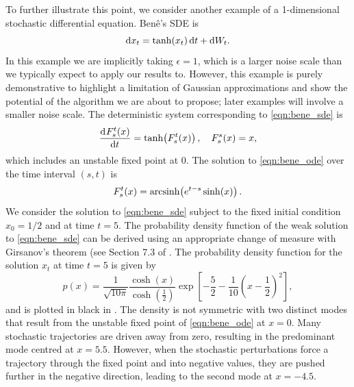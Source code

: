 To further illustrate this point, we consider another example of a 1-dimensional stochastic differential equation.
Ben\^e's SDE \citep{SarkkaSolin_2019_AppliedStochasticDifferential} is
\begin{equation}
	\dif x_t = \tanh\!\left(x_t\right)\dif t + \dif W_t.
	\label{eqn:bene_sde}
\end{equation}
In this example we are implicitly taking \(\epsilon = 1\), which is a larger noise scale than we typically expect to apply our results to.
However, this example is purely demonstrative to highlight a limitation of Gaussian approximations and show the potential of the algorithm we are about to propose; later examples will involve a smaller noise scale.
The deterministic system corresponding to \cref{eqn:bene_sde} is
\begin{equation}
	\dod{F_s^t\!\left(x\right)}{t} = \tanh\!\left(F_s^t\!\left(x\right)\right), \quad F_s^s\!\left(x\right) = x,
	\label{eqn:bene_ode}
\end{equation}
which includes an unstable fixed point at \(0\).
The solution to \cref{eqn:bene_ode} over the time interval \((s,t)\) is
\begin{equation}
	F_s^t\!\left(x\right) = \operatorname{arcsinh}\!\left(e^{t-s}\sinh\!\left(x\right)\right).
	\label{eqn:bene_ode_sol}
\end{equation}
We consider the solution to \cref{eqn:bene_sde} subject to the fixed initial condition \(x_0 = 1/2\) and at time \(t = 5\).
The probability density function of the weak solution to \cref{eqn:bene_sde} can be derived using an appropriate change of measure with Girsanov's theorem (see Section 7.3 of \citet{SarkkaSolin_2019_AppliedStochasticDifferential}.
The probability density function for the solution \(x_t\) at time \(t = 5\) is given by
\begin{equation}\label{eqn:bene_sde_pdf}
	p(x) = \frac{1}{\sqrt{10\pi}}\frac{\cosh\left(x\right)}{\cosh\!\left(\frac12\right)}\exp\left[-\frac{5}{2} - \frac{1}{10}\left(x - \frac12\right)^2\right],
\end{equation}
and is plotted in black in .
The density is not symmetric with two distinct modes that result from the unstable fixed point of \cref{eqn:bene_ode} at \(x = 0\).
Many stochastic trajectories are driven away from zero, resulting in the predominant mode centred at \(x = 5.5\).
However, when the stochastic perturbations force a trajectory through the fixed point and into negative values, they are pushed further in the negative direction, leading to the second mode at \(x = -4.5\).
